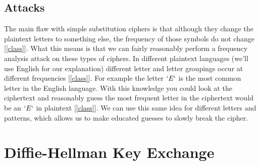 \documentclass[12pt]{article}
\begin{document}
\subsection{Attacks}
The main flaw with simple substitution ciphers is that although they change the plaintext letters to something else, the frequency of those symbols do not change [\ref{class}]. What this means is that we can fairly reasonably perform a frequency analysis attack on these types of ciphers. In different plaintext languages (we'll use English for our explanation) different letter and letter groupings occur at different frequencies [\ref{class}]. For example the letter $`E`$ is the most common letter in the English language. With this knowledge you could look at the ciphertext and reasonably guess the most frequent letter in the ciphertext would be an $`E`$ in plaintext [\ref{class}]. We can use this same idea for different letters and patterns, which allows us to make educated guesses to slowly break the cipher. 


\section{Diffie-Hellman Key Exchange}
\end{document}
